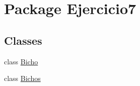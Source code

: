 \hypertarget{namespace_ejercicio7}{}\section{Package Ejercicio7}
\label{namespace_ejercicio7}
\subsection*{Classes}
\begin{DoxyCompactItemize}
\item 
class \mbox{\hyperlink{class_ejercicio7_1_1_bicho}{Bicho}}
\item 
class \mbox{\hyperlink{class_ejercicio7_1_1_bichos}{Bichos}}
\end{DoxyCompactItemize}
